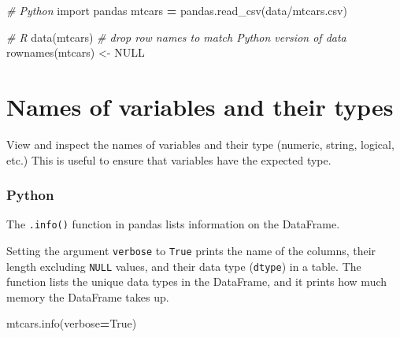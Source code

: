 \documentclass[
]{book}
\newenvironment{Shaded}{\begin{snugshade}}{\end{snugshade}}
\newcommand{\CommentTok}[1]{\textcolor[rgb]{0.56,0.35,0.01}{\textit{#1}}}
\newcommand{\ConstantTok}[1]{\textcolor[rgb]{0.00,0.00,0.00}{#1}}
\newcommand{\FunctionTok}[1]{\textcolor[rgb]{0.00,0.00,0.00}{#1}}
\newcommand{\ImportTok}[1]{#1}
\newcommand{\NormalTok}[1]{#1}
\newcommand{\OperatorTok}[1]{\textcolor[rgb]{0.81,0.36,0.00}{\textbf{#1}}}
\newcommand{\OtherTok}[1]{\textcolor[rgb]{0.56,0.35,0.01}{#1}}
\newcommand{\StringTok}[1]{\textcolor[rgb]{0.31,0.60,0.02}{#1}}
\newcommand{\VariableTok}[1]{\textcolor[rgb]{0.00,0.00,0.00}{#1}}
\begin{document}
\begin{Shaded}
\begin{Highlighting}[]
\CommentTok{\# Python}
\ImportTok{import}\NormalTok{ pandas}
\NormalTok{mtcars }\OperatorTok{=}\NormalTok{ pandas.read\_csv(}\StringTok{\textquotesingle{}data/mtcars.csv\textquotesingle{}}\NormalTok{)}
\end{Highlighting}
\end{Shaded}

\begin{Shaded}
\begin{Highlighting}[]
\CommentTok{\# R}
\FunctionTok{data}\NormalTok{(mtcars)}
\CommentTok{\# drop row names to match Python version of data}
\FunctionTok{rownames}\NormalTok{(mtcars) }\OtherTok{\textless{}{-}} \ConstantTok{NULL}
\end{Highlighting}
\end{Shaded}

\hypertarget{names-of-variables-and-their-types}{%
\section{Names of variables and their types}\label{names-of-variables-and-their-types}}

View and inspect the names of variables and their type (numeric, string, logical, etc.) This is useful to ensure that variables have the expected type.

\hypertarget{python-17}{%
\subsubsection*{Python}\label{python-17}}

The \texttt{.info()} function in pandas lists information on the DataFrame.

Setting the argument \texttt{verbose} to \texttt{True} prints the name of the columns, their length excluding \texttt{NULL} values, and their data type (\texttt{dtype}) in a table. The function lists the unique data types in the DataFrame, and it prints how much memory the DataFrame takes up.

\begin{Shaded}
\begin{Highlighting}[]
\NormalTok{mtcars.info(verbose}\OperatorTok{=}\VariableTok{True}\NormalTok{)}
\end{Highlighting}
\end{Shaded}
\end{document}
